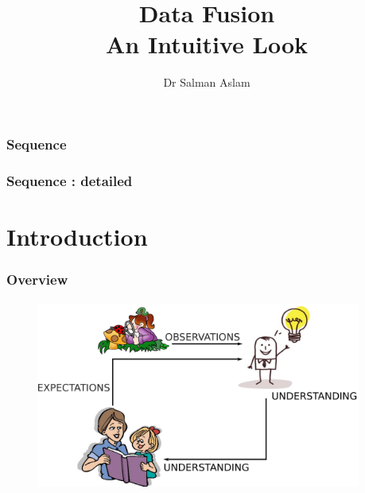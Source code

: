 

\title{Data Fusion\\
An Intuitive Look}  
\author{Dr Salman Aslam}
\date{} 




\begin{frame}[plain]\pw\Large
\vspace{0.8in}
\titlepage
\end{frame}

\begin{frame}[plain]\pw\Large
\frametitle{\textbf{Sequence}}
\setcounter{tocdepth}{1}
\tableofcontents
\end{frame} 

\begin{frame}[plain]\pw\Large
\frametitle{\textbf{Sequence : detailed}}
\setcounter{tocdepth}{2}
\tableofcontents%
\end{frame} 

\section{Introduction}
\begin{frame}\pw\Large
\frametitle{Overview}
\framesubtitle{}
\begin{figure}
\includegraphics[width=0.95\textwidth]{figs/WFAR11_UCP_Update_Prediction_BlockDiagram-1.pdf}
\end{figure}
\end{frame}


